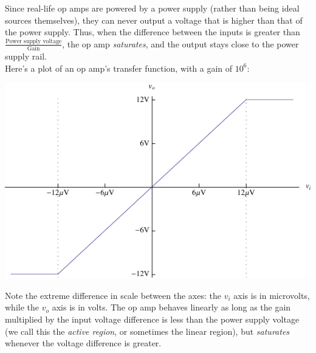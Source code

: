 \documentclass[12pt,a4paper]{report}
\begin{document}
Since real-life op amps are powered by a power supply (rather than being ideal sources themselves), they can never output a voltage that is higher than that of the power supply. Thus, when the difference between the inputs is greater than $\displaystyle \frac{\text{Power supply voltage}}{\text{Gain}}$, the op amp \emph{saturates}, and the output stays close to the power supply rail.\\
Here's a plot of an op amp's transfer function, with a gain of $10^6$:

\includegraphics[scale=1.5]{Graphics/opamp_transfer_function}

Note the extreme difference in scale between the axes: the $v_i$ axis is in microvolts, while the $v_o$ axis is in volts. The op amp behaves linearly as long as the gain multiplied by the input voltage difference is less than the power supply voltage (we call this the \emph{active region}, or sometimes the linear region), but \emph{saturates} whenever the voltage difference is greater.\\
\end{document}
